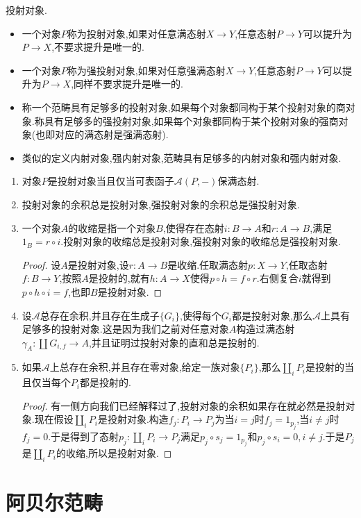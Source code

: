 投射对象.
\begin{itemize}
	\item 一个对象$P$称为投射对象,如果对任意满态射$X\to Y$,任意态射$P\to Y$可以提升为$P\to X$,不要求提升是唯一的.
	\item 一个对象$P$称为强投射对象,如果对任意强满态射$X\to Y$,任意态射$P\to Y$可以提升为$P\to X$,同样不要求提升是唯一的.
	\item 称一个范畴具有足够多的投射对象,如果每个对象都同构于某个投射对象的商对象.称具有足够多的强投射对象,如果每个对象都同构于某个投射对象的强商对象(也即对应的满态射是强满态射).
	\item 类似的定义内射对象,强内射对象,范畴具有足够多的内射对象和强内射对象.
\end{itemize}
\begin{enumerate}
	\item 对象$P$是投射对象当且仅当可表函子$\mathscr{A}(P,-)$保满态射.
	\item 投射对象的余积总是投射对象,强投射对象的余积总是强投射对象.
	\item 一个对象$A$的收缩是指一个对象$B$,使得存在态射$i:B\to A$和$r:A\to B$,满足$1_B=r\circ i$.投射对象的收缩总是投射对象,强投射对象的收缩总是强投射对象.
	\begin{proof}
		
		设$A$是投射对象,设$r:A\to B$是收缩.任取满态射$p:X\to Y$,任取态射$f:B\to Y$,按照$A$是投射的,就有$h:A\to X$使得$p\circ h=f\circ r$.右侧复合$i$就得到$p\circ h\circ i=f$,也即$B$是投射对象.
	\end{proof}
    \item 设$\mathscr{A}$总存在余积,并且存在生成子$\{G_i\}$,使得每个$G_i$都是投射对象,那么$\mathscr{A}$上具有足够多的投射对象.这是因为我们之前对任意对象$A$构造过满态射$\gamma_A:\coprod G_{i,f}\to A$,并且证明过投射对象的直和总是投射的.
    \item 如果$\mathscr{A}$上总存在余积,并且存在零对象,给定一族对象$\{P_i\}$,那么$\coprod_iP_i$是投射的当且仅当每个$P_i$都是投射的.
    \begin{proof}
    	
    	有一侧方向我们已经解释过了,投射对象的余积如果存在就必然是投射对象.现在假设$\coprod_iP_i$是投射对象.构造$f_j:P_i\to P_j$为当$i=j$时$f_j=1_{p_j}$,当$i\not=j$时$f_j=0$.于是得到了态射$p_j:\coprod_iP_i\to P_j$满足$p_j\circ s_j=1_{p_j}$和$p_j\circ s_i=0,i\not=j$.于是$P_j$是$\coprod_iP_i$的收缩,所以是投射对象.
    \end{proof}
\end{enumerate}
\newpage
\section{阿贝尔范畴}

